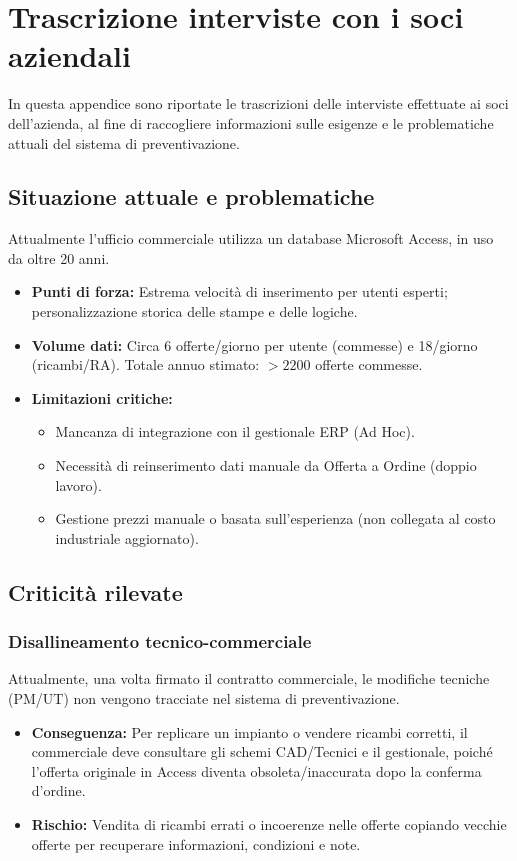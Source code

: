 \chapter{Trascrizione interviste con i soci aziendali}\label{app:risultati-interviste-proprieta} %
In questa appendice sono riportate le trascrizioni delle interviste effettuate ai soci dell'azienda,
al fine di raccogliere informazioni sulle esigenze e le problematiche attuali del sistema di preventivazione.
\section{Situazione attuale e problematiche}
Attualmente l'ufficio commerciale utilizza un database Microsoft Access, in uso da
oltre 20 anni.
\begin{itemize}
      \item \textbf{Punti di forza:} Estrema velocità di inserimento per utenti esperti; personalizzazione
            storica delle stampe e delle logiche.
      \item \textbf{Volume dati:} Circa 6 offerte/giorno per utente (commesse) e 18/giorno (ricambi/\ac{RA}).
            Totale annuo stimato: \(>2200\) offerte commesse.
      \item \textbf{Limitazioni critiche:}
            \begin{itemize}
                  \item Mancanza di integrazione con il gestionale \ac{ERP} (Ad Hoc).
                  \item Necessità di reinserimento dati manuale da Offerta a Ordine (doppio lavoro).
                  \item Gestione prezzi manuale o basata sull'esperienza (non collegata al costo
                        industriale aggiornato).
            \end{itemize}
\end{itemize}

\section{Criticità rilevate}
\subsection{Disallineamento tecnico-commerciale}
Attualmente, una volta firmato il contratto commerciale, le modifiche tecniche (\ac{PM}/\ac{UT})
non vengono tracciate nel sistema di preventivazione.
\begin{itemize}
      \item \textbf{Conseguenza:} Per replicare un impianto o vendere ricambi corretti, il commerciale
            deve consultare gli schemi CAD/Tecnici e il gestionale,
            poiché l'offerta originale in Access diventa obsoleta/inaccurata dopo la conferma d'ordine.
      \item \textbf{Rischio:} Vendita di ricambi errati o incoerenze nelle offerte copiando vecchie offerte
            per recuperare informazioni, condizioni e note.
\end{itemize}

